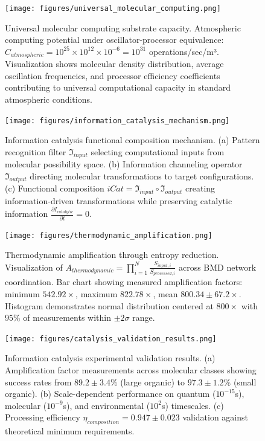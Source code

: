 \begin{figure}[H]
\centering
\texttt{[image: figures/universal\_molecular\_computing.png]}
\caption{Universal molecular computing substrate capacity. Atmospheric computing potential under oscillator-processor equivalence: $C_{atmospheric} = 10^{25} \times 10^{12} \times 10^{-6} = 10^{31}$ operations/sec/m³. Visualization shows molecular density distribution, average oscillation frequencies, and processor efficiency coefficients contributing to universal computational capacity in standard atmospheric conditions.}
\label{fig:universal_computing}
\end{figure}


\begin{figure}[H]
\centering
\texttt{[image: figures/information\_catalysis\_mechanism.png]}
\caption{Information catalysis functional composition mechanism. (a) Pattern recognition filter $\mathfrak{I}_{input}$ selecting computational inputs from molecular possibility space. (b) Information channeling operator $\mathfrak{I}_{output}$ directing molecular transformations to target configurations. (c) Functional composition $iCat = \mathfrak{I}_{input} \circ \mathfrak{I}_{output}$ creating information-driven transformations while preserving catalytic information $\frac{\partial I_{catalytic}}{\partial t} = 0$.}
\label{fig:catalysis_mechanism}
\end{figure}

\begin{figure}[H]
\centering
\texttt{[image: figures/thermodynamic\_amplification.png]}
\caption{Thermodynamic amplification through entropy reduction. Visualization of $A_{thermodynamic} = \prod_{i=1}^{N} \frac{S_{input,i}}{S_{processed,i}}$ across BMD network coordination. Bar chart showing measured amplification factors: minimum $542.92 \times$, maximum $822.78 \times$, mean $800.34 \pm 67.2 \times$. Histogram demonstrates normal distribution centered at $800 \times$ with $95\%$ of measurements within $\pm 2\sigma$ range.}
\label{fig:thermodynamic_amplification}
\end{figure}

\begin{figure}[H]
\centering
\texttt{[image: figures/catalysis\_validation\_results.png]}
\caption{Information catalysis experimental validation results. (a) Amplification factor measurements across molecular classes showing success rates from $89.2 \pm 3.4\%$ (large organic) to $97.3 \pm 1.2\%$ (small organic). (b) Scale-dependent performance on quantum ($10^{-15}$s), molecular ($10^{-9}$s), and environmental ($10^{2}$s) timescales. (c) Processing efficiency $\eta_{composition} = 0.947 \pm 0.023$ validation against theoretical minimum requirements.}
\label{fig:catalysis_validation}
\end{figure}

